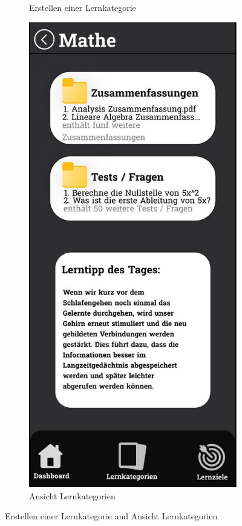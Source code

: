 \begin{figure}[htbp]
\begin{subfigure}[b]{0.45\linewidth}
          \caption{Erstellen einer Lernkategorie}
          \label{fig:lernkategorie-create}
        \end{subfigure}
        \hfill
        \begin{subfigure}[b]{0.45\linewidth}
          \centering
          \includegraphics[width=\linewidth]{images/Mockups/Lernkategorie.JPG}
          \caption{Ansicht Lernkategorien}
          \label{fig:lernkategorie-ansicht}
        \end{subfigure}
        \caption{Erstellen einer Lernkategorie and Ansicht Lernkategorien}
        \label{fig:lernkategorie}
      \end{figure}

